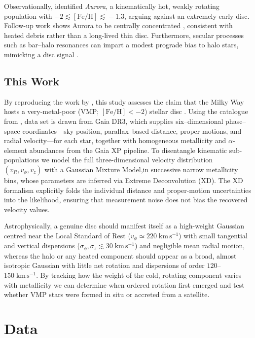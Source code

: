 \documentclass[a4paper,12pt]{article}
\begin{document}
Observationally, \citet{Belokurov2022} identified \textit{Aurora}, a kinematically hot, weakly rotating  
population with $-2\!\lesssim\![\mathrm{Fe/H}]\!\lesssim\!-1.3$, arguing against an extremely early disc.  
Follow-up work shows Aurora to be centrally concentrated \citep{Rix2022,Arentsen2020,Arentsen2020a}, 
consistent with heated debris rather than a long-lived thin disc.  
Furthermore, secular processes such as bar–halo resonances can impart a modest prograde bias to halo stars, 
mimicking a disc signal \citep{Dillamore2023}.  

\subsection{This Work}

By reproducing the work by \citet{zhang2024existencemetalpoordiscmilky}, this study assesses 
the claim that the Milky Way hosts a very-metal-poor 
(VMP; $[\mathrm{Fe/H}]<-2$) stellar disc . 
Using the catalogue from \citet{Andrae2023}, data set is drawn from Gaia DR3, 
which supplies six–dimensional phase–space coordinates—sky position, parallax–based distance, 
proper motions, and radial velocity—for each star, together with homogeneous metallicity and 
$\alpha$-element abundances from the Gaia XP pipeline.  To disentangle kinematic 
sub-populations we model the full three-dimensional 
velocity distribution $(v_R,v_\phi,v_z)$ with a Gaussian Mixture Model,in successive narrow metallicity bins, whose parameters are inferred 
via Extreme Deconvolution (XD). The XD formalism explicitly folds the individual distance and 
proper-motion uncertainties into the likelihood, ensuring that measurement noise does not bias 
the recovered velocity values.

Astrophysically, a genuine disc should manifest itself as a high-weight Gaussian centred near the Local 
Standard of Rest ($v_\phi\simeq220\;\mathrm{km\,s^{-1}}$) with small tangential and vertical dispersions 
($\sigma_\phi,\sigma_z\lesssim30\;\mathrm{km\,s^{-1}}$) and negligible mean radial motion, whereas the 
halo or any heated component should appear as a broad, almost isotropic Gaussian with little net rotation 
and dispersions of order $120$–$150\;\mathrm{km\,s^{-1}}$.  By tracking how the weight of the cold, 
rotating component varies with metallicity we can determine when ordered rotation first emerged and 
test whether VMP stars were formed in situ or accreted from a satellite.


\section{Data}
\label{sec:data}
\end{document}

